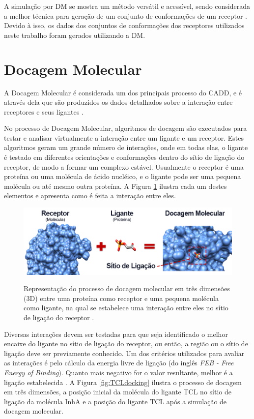 A simulação por DM se mostra um método versátil e acessível, sendo considerada a melhor técnica para geração de um conjunto de conformações de um receptor \cite{kar11}. Devido à isso, os dados dos conjuntos de conformações dos receptores utilizados neste trabalho foram gerados utilizando a DM.


\section{Docagem Molecular}

A Docagem Molecular é considerada um dos principais processo do CADD, e é através dela que são produzidos os dados detalhados sobre a interação entre receptores e seus ligantes \cite{LEN96}. 

No processo de Docagem Molecular, algoritmos de docagem são executados para testar e analisar virtualmente a interação entre um ligante e um receptor. Estes algoritmos geram um grande número de interações, onde em todas elas, o ligante é testado em diferentes orientações e conformações dentro do sítio de ligação do receptor, de modo a formar um complexo estável. 
Usualmente o receptor é uma proteína ou uma molécula de ácido nucléico, e o ligante pode ser uma pequena molécula ou até mesmo outra proteína. A Figura \ref{fig:docking} \cite{ALE13} ilustra cada um destes elementos e apresenta como é feita a interação entre eles.

\begin{figure}[h]
	\center
	\includegraphics[width=14cm]{images/docking.png}
	\label{fig:docking}
	\caption{Representação do processo de docagem molecular em três dimensões (3D) entre uma proteína como receptor e uma pequena molécula como ligante, na qual se estabelece uma interação entre eles no sítio de ligação do receptor \cite{ALE13}.}
\end{figure}

Diversas interações devem ser testadas para que seja identificado o melhor encaixe do ligante no sítio de ligação do receptor, ou então, a região ou o sítio de ligação deve ser previamente conhecido. Um dos critérios utilizados para avaliar as interações é pelo cálculo da energia livre de ligação (do inglês \emph{FEB - Free Energy of Binding}). Quanto mais negativo for o valor resultante, melhor é a ligação estabelecida \cite{kar07}. A Figura \ref{fig:TCLdocking} \cite{REN13} ilustra o processo de docagem em três dimensões, a posição inicial da molécula do ligante TCL no sítio de ligação da molécula InhA e a posição do ligante TCL após a simulação de docagem molecular.


